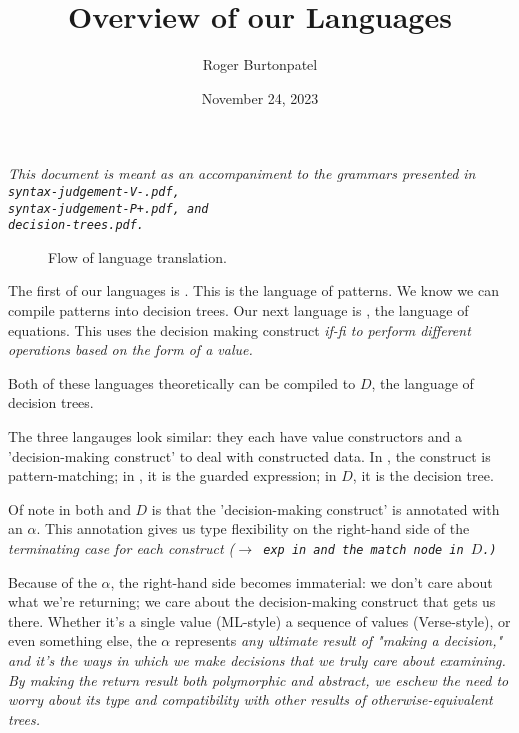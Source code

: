 \documentclass{article}
\title{Overview of our Languages}
\author{Roger Burtonpatel}
\date{November 24, 2023}
\begin{document}
\maketitle

\it{This document is meant as an accompaniment to the grammars presented in} \\
\tt{syntax-judgement-V-.pdf}\it{,} \\
\tt{syntax-judgement-P+.pdf}\it{, and} \\
\tt{decision-trees.pdf}\it{.}



\bigskip
\begin{figure}[H]
    \centering
    \caption{Flow of language translation.}
    \label{fig:graph}
\end{figure}


The first of our languages is \Pplus. This is the language of patterns. We know
we can compile patterns into decision trees. Our next language is \Vminus, the
language of equations. This uses the decision making construct \it{if-fi} to
perform different operations based on the form of a value. 

Both of these languages theoretically can be compiled to $D$, the language
of decision trees. 

\bigskip

The three langauges look similar: they each have value constructors and 
a 'decision-making construct' to deal with constructed data. In \Pplus, the 
construct is pattern-matching; in \Vminus, it is the guarded expression; 
in $D$, it is the decision tree. 

Of note in both \Vminus and $D$ is that the 'decision-making construct' is 
annotated with an $\alpha$. This annotation gives us type flexibility on the 
right-hand side of the \it{terminating} case for each construct 
(\tt{$\rightarrow$ exp} in \Vminus and the match node in $D$.) 

Because of the $\alpha$, the right-hand side becomes immaterial: we don't care
about what we're returning; we care about the decision-making construct that
gets us there. Whether it's a single value (ML-style) a sequence of values
(Verse-style), or even something else, the $\alpha$ represents \it{any} ultimate
result of "making a decision," and it's the ways in which we make decisions that
we truly care about examining. By making the return result both polymorphic and
abstract, we eschew the need to worry about its type and compatibility with
other results of otherwise-equivalent trees. 
\end{document}
